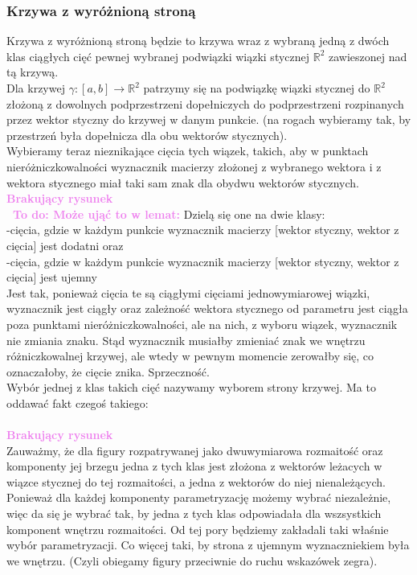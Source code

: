 \documentclass[a4paper, 12pt]{article}
\newcommand{\smalltodoII}[1]{\hfill \break \textbf{\ \textcolor{violet}{To do: #1}}\hfill \break}
\newcommand{\rysunek}[1]{\hfill \break\\[16pt] \Huge \textbf{\textcolor{violet}{Brakujący rysunek \normalsize
#1}} \hfill
\break \\[16pt] \normalsize}
\begin{document}
\subsubsection{Krzywa z wyróżnioną stroną}
Krzywa z wyróżnioną stroną będzie to krzywa wraz z wybraną jedną z dwóch klas ciągłych cięć pewnej wybranej
 podwiązki wiązki stycznej $\mathbb{R}^2$ zawieszonej nad tą krzywą. \\
Dla krzywej $\gamma : [a, b] \to \mathbb{R}^2$ patrzymy się na podwiązkę wiązki stycznej do
$\mathbb{R}^2$ złożoną
z dowolnych podprzestrzeni dopełniczych do podprzestrzeni rozpinanych przez wektor styczny do krzywej w
danym punkcie. (na rogach wybieramy tak, by przestrzeń była dopełnicza dla obu wektorów stycznych). \\
Wybieramy teraz nieznikające cięcia tych wiązek, takich, aby w punktach nieróżniczkowalności
wyznacznik macierzy złożonej z wybranego wektora i z wektora stycznego miał taki sam znak dla obydwu
wektorów stycznych.
\rysunek{}
\smalltodoII{Może ująć to w lemat:}
Dzielą się one na dwie klasy: \\
-cięcia, gdzie w każdym punkcie wyznacznik macierzy [wektor styczny, wektor z cięcia] jest dodatni oraz\\
-cięcia, gdzie w każdym punkcie wyznacznik macierzy [wektor styczny, wektor z cięcia] jest ujemny \\
Jest tak, ponieważ cięcia te są ciągłymi cięciami jednowymiarowej wiązki, wyznacznik jest ciągły oraz
zależność wektora stycznego od parametru jest ciągła poza punktami nieróżniczkowalności, ale na nich,
z wyboru wiązek, wyznacznik nie zmiania znaku. Stąd wyznacznik musiałby zmieniać znak we wnętrzu
różniczkowalnej krzywej, ale wtedy w pewnym momencie zerowałby się, co oznaczałoby, że cięcie znika.
Sprzeczność. \\
Wybór jednej z klas takich cięć nazywamy wyborem strony krzywej. Ma to oddawać fakt czegoś takiego: \\
\rysunek{}
Zauważmy, że dla figury rozpatrywanej jako dwuwymiarowa rozmaitość oraz komponenty jej brzegu jedna z tych
klas jest złożona z wektorów leżacych w wiązce stycznej do tej rozmaitości, a jedna z wektorów do niej
nienależących. Ponieważ dla każdej komponenty parametryzację możemy wybrać niezależnie, więc da się je wybrać
tak, by jedna z tych klas odpowiadała dla wszsystkich komponent wnętrzu rozmaitości. Od tej pory będziemy
zakładali taki właśnie wybór parametryzacji. Co więcej taki, by strona z ujemnym wyznaczniekiem była we
wnętrzu. (Czyli obiegamy figury przeciwnie do ruchu wskazówek zegra). \\
\end{document}
